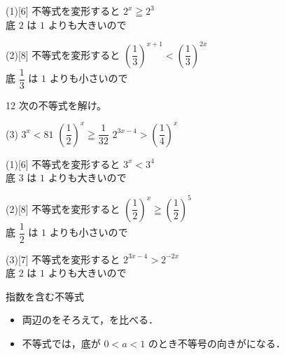 \documentclass[14pt,dvipdfmx]{jsarticle}
\begin{document}
\begin{answerbox}{(1)}[6]
  不等式を変形すると $2^x\geqq 2^3$\\
  底 $2$ は $1$ よりも大きいので
\end{answerbox}
\begin{answerbox}{(2)}[8]
  不等式を変形すると $\left(\dfrac{1}{3}\right)^{x+1}<\left(\dfrac{1}{3}\right)^{2x}$\\
  底 $\dfrac{1}{3}$ は $1$ よりも小さいので
\end{answerbox}

\begin{practiceprob}{12}
  次の不等式を解け。
  \begin{tasks}[label=(\arabic*), label-width=1.6zw, item-indent=2zw, after-item-skip=0.15em](3)
    \task $3^x < 81$
    \task $\left(\dfrac{1}{2}\right)^x \geqq \dfrac{1}{32}$
    \task $2^{3x-4} > \left(\dfrac{1}{4}\right)^x$
  \end{tasks}
\end{practiceprob}

\begin{answerbox}{(1)}[6]
  不等式を変形すると $3^x<3^4$\\
  底 $3$ は $1$ よりも大きいので
\end{answerbox}
\begin{answerbox}{(2)}[8]
  不等式を変形すると $\left(\dfrac{1}{2}\right)^x\geqq\left(\dfrac{1}{2}\right)^5$\\
  底 $\dfrac{1}{2}$ は $1$ よりも小さいので
\end{answerbox}
\begin{answerbox}{(3)}[7]
  不等式を変形すると $2^{3x-4}>2^{-2x}$\\
  底 $2$ は $1$ よりも大きいので
\end{answerbox}



\vfill
\nextpage

\begin{techniquebox}{指数を含む不等式}
  \begin{itemize}[leftmargin=1.5zw, itemsep=0.15em]
    \item 両辺のをそろえて，を比べる．
    \item 不等式では，底が $0<a<1$ のとき不等号の向きがになる．
  \end{itemize}
\end{techniquebox}
\end{document}
